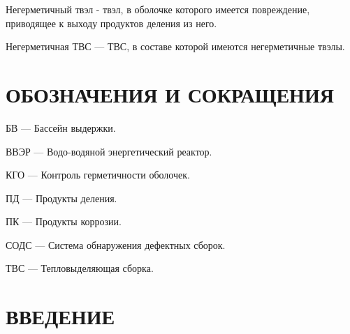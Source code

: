 \documentclass[a4paper,12pt]{article}
\begin{document}
Негерметичный твэл - твэл, в оболочке которого имеется повреждение,
приводящее к выходу продуктов деления из него.

Негерметичная ТВС --- ТВС, в составе которой имеются негерметичные твэлы.

\pagebreak

\section*{\centering ОБОЗНАЧЕНИЯ И СОКРАЩЕНИЯ}

\thispagestyle{empty} %

БВ --- Бассейн выдержки.

ВВЭР --- Водо-водяной энергетический реактор.

КГО --- Контроль герметичности оболочек.

ПД --- Продукты деления.

ПК --- Продукты коррозии.

СОДС --- Система обнаружения дефектных сборок.

ТВС --- Тепловыделяющая сборка.

\pagebreak


\tableofcontents

\thispagestyle{empty}

\pagebreak

\setcounter{page}{3}

\section*{\centering ВВЕДЕНИЕ}
\pagebreak

%
\pagebreak
\pagebreak
\pagebreak
\pagebreak

\end{document}
